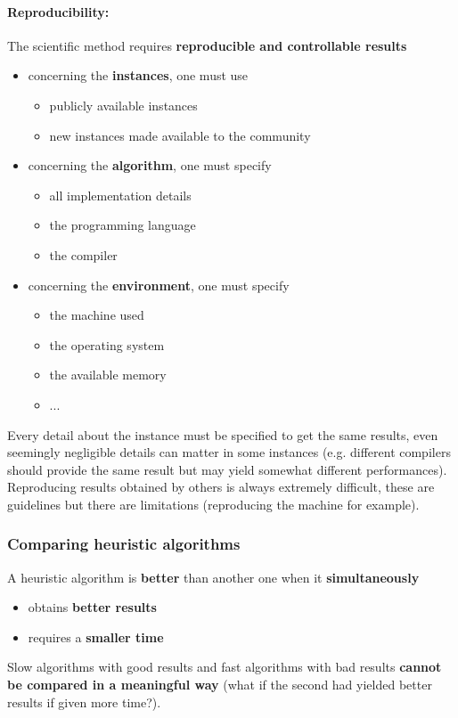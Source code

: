 \paragraph{Reproducibility:} The scientific method requires \textbf{reproducible and controllable results}
\begin{itemize}
	\item concerning the \textbf{instances}, one must use
	\begin{itemize}
		\item publicly available instances
		\item new instances made available to the community
	\end{itemize}
	\item concerning the \textbf{algorithm}, one must specify
	\begin{itemize}
		\item all implementation details
		\item the programming language
		\item the compiler
	\end{itemize}
	\item concerning the \textbf{environment}, one must specify
	\begin{itemize}
		\item the machine used
		\item the operating system
		\item the available memory
		\item ... 
	\end{itemize}
\end{itemize}
Every detail about the instance must be specified to get the same results, even seemingly negligible details can matter in some instances (e.g. different compilers should provide the same result but may yield somewhat different performances).\\

Reproducing results obtained by others is always extremely difficult, these are guidelines but there are limitations (reproducing the machine for example).\\

\newpage

\subsubsection{Comparing heuristic algorithms}
A heuristic algorithm is \textbf{better} than another one when it \textbf{simultaneously}
\begin{itemize}
	\item obtains \textbf{better results}
	\item requires a \textbf{smaller time}
\end{itemize}
Slow algorithms with good results and fast algorithms with bad results \textbf{cannot be compared in a meaningful way} (what if the second had yielded better results if given more time?).\\

